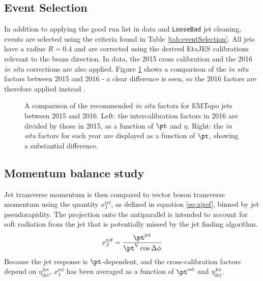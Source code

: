 \documentclass[NOTE, atlasdraft=true, texlive=2016, USenglish]{\ATLASLATEXPATH atlasdoc}
\begin{document}
\subsection{Event Selection}
In addition to applying the good run list in data and \texttt{LooseBad} jet cleaning, events are selected using the criteria found in Table \ref{tab:eventSelection}. All jets have a radius $R=0.4$ and are corrected using the derived EtaJES calibrations relevant to the beam direction. In data, the 2015 cross calibration and the 2016 \textit{in situ} corrections are also applied. Figure \ref{fig:insituComp} shows a comparison of the \textit{in situ} factors between 2015 and 2016 - a clear difference is seen, so the 2016 factors are therefore applied instead \cite{ATLAS-CONF-2015-017}.
\begin{figure}[htbp]
	\centering
	\caption{A comparison of the recommended \textit{in situ} factors for EMTopo jets between 2015 and 2016. Left: the intercalibration factors in 2016 are divided by those in 2015, as a function of $\pt$ and $\eta$. Right: the \textit{in situ} factors for each year are displayed as a function of $\pt$, showing a substantial difference.}
	\label{fig:insituComp}
\end{figure}

\subsection{Momentum balance study}
Jet transverse momentum is then compared to vector boson transverse momentum using the quantity $x_{\text{J}}^{\text{ref}}$, as defined in equation \ref{eq:xjref}, binned by jet pseudorapidity. The projection onto the antiparallel is intended to account for soft radiation from the jet that is potentially missed by the jet finding algorithm.
\begin{equation}
	x_{\text{J}}^{\text{ref}} = \frac{\pt^{\text{jet}}}{\pt^{\text{V}} \cos{\Delta\phi}}
	\label{eq:xjref}
\end{equation}
Because the jet response is $\pt$-dependent, and the cross-calibration factors depend on $\eta_{\text{det}}^{\text{Jet}}$, $x_{\text{J}}^{\text{ref}}$ has been averaged as a function of $\pt^{\text{ref}}$ and $\eta_{\text{det}}^{\text{Jet}}$. 
\end{document}
